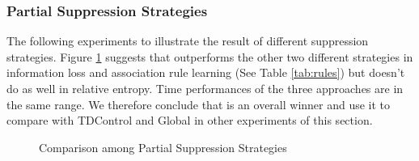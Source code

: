 \subsubsection{Partial Suppression Strategies}\label{sec:eval:partialsuppression}
The following experiments to illustrate the result of
different suppression strategies.
Figure \ref{fig:partial} suggests that \PartialR
outperforms the other two different strategies in information loss
and association rule learning (See Table \ref{tab:rules}) but doesn't do
as well in relative entropy. Time performances of the three approaches
are in the same range. We therefore conclude that \PartialR is an overall
winner and use it to compare with TDControl and Global in
other experiments of this section.

\begin{figure}[th]
\centering
  \flushleft
{}
\caption{Comparison among Partial Suppression Strategies}
\label{fig:partial}
\end{figure}

